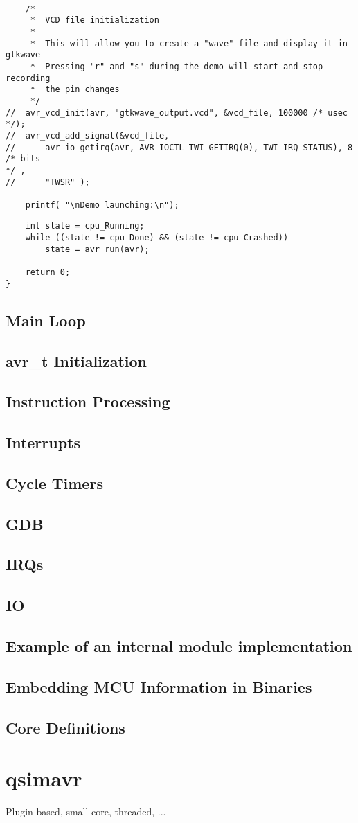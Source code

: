 \begin{lstlisting}

    /*
     *  VCD file initialization
     *
     *  This will allow you to create a "wave" file and display it in gtkwave
     *  Pressing "r" and "s" during the demo will start and stop recording
     *  the pin changes
     */
//  avr_vcd_init(avr, "gtkwave_output.vcd", &vcd_file, 100000 /* usec */);
//  avr_vcd_add_signal(&vcd_file,
//      avr_io_getirq(avr, AVR_IOCTL_TWI_GETIRQ(0), TWI_IRQ_STATUS), 8 /* bits
*/ ,
//      "TWSR" );

    printf( "\nDemo launching:\n");
\end{lstlisting}



\begin{lstlisting}
    int state = cpu_Running;
    while ((state != cpu_Done) && (state != cpu_Crashed))
        state = avr_run(avr);

    return 0;
}
\end{lstlisting}


\subsection{Main Loop}
\subsection{avr\_t Initialization}
\subsection{Instruction Processing}
\subsection{Interrupts}
\subsection{Cycle Timers}
\subsection{GDB}
\subsection{IRQs}
\subsection{IO}
\subsection{Example of an internal module implementation} %
\subsection{Embedding MCU Information in Binaries}
\subsection{Core Definitions}

\section{qsimavr}

Plugin based, small core, threaded, ...

